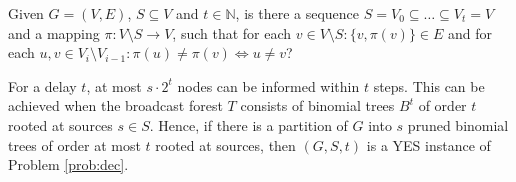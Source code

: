 \begin{problem}
\label{prob:dec}
Given $G=(V,E)$, $S\subseteq V$ and $t\in \mathbb{N}$, is there a sequence $S=V_0\subseteq\dots\subseteq V_t=V$ 
and a mapping $\pi:V\setminus S\to V$, such that for each $v\in V\setminus S:\{v,\pi(v)\}\in E$ and for each  $u,v\in V_i\setminus V_{i-1}: \pi(u)\neq \pi(v)\Leftrightarrow u\neq v$?
\end{problem}
For a delay $t$, at most $s\cdot 2^t$ nodes can be informed within $t$ steps. 
This can be achieved when the broadcast forest $T$ consists of binomial trees $B^t$ of order $t$ rooted at sources $s\in S$.
Hence, if there is a partition of $G$ into $s$ pruned binomial trees of order at most $t$ rooted at sources, then $(G,S,t)$ is a YES instance of Problem \ref{prob:dec}.

